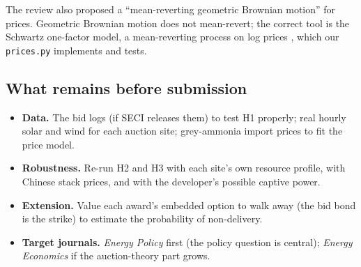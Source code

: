 \noindent The review also proposed a ``mean-reverting geometric Brownian motion'' for prices. Geometric Brownian motion does not mean-revert; the correct tool is the Schwartz one-factor model, a mean-reverting process on log prices \cite{schwartz1997}, which our \texttt{prices.py} implements and tests.

\subsection{What remains before submission}
\begin{itemize}
\item \textbf{Data.} The bid logs (if SECI releases them) to test H1 properly; real hourly solar and wind for each auction site; grey-ammonia import prices to fit the price model.
\item \textbf{Robustness.} Re-run H2 and H3 with each site's own resource profile, with Chinese stack prices, and with the developer's possible captive power.
\item \textbf{Extension.} Value each award's embedded option to walk away (the bid bond is the strike) to estimate the probability of non-delivery.
\item \textbf{Target journals.} \emph{Energy Policy} first (the policy question is central); \emph{Energy Economics} if the auction-theory part grows.
\end{itemize}
\newpage
